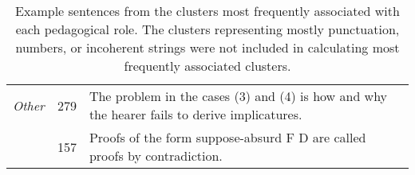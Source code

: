 \documentclass[11pt,a4paper]{article}
\begin{document}
\begin{table*}[bht]
\begin{tabular}{c S[table-format=3] p{10cm}}
\textit{Other} & 279 & The problem in the cases (3) and (4) is how and why the hearer fails to derive implicatures. \\
& 157 & Proofs of the form suppose-absurd F D are called proofs by contradiction. \\
\hline\hline
\end{tabular}

\caption{Example sentences from the clusters most frequently associated with each pedagogical role. The clusters representing mostly punctuation, numbers, or incoherent strings were not included in calculating most frequently associated clusters.}
\label{table:roleexamples}
\end{table*}
\end{document}
